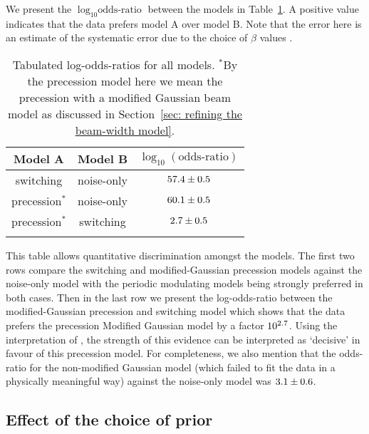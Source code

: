 \documentclass[../full_thesis/full_thesis.tex]{subfiles}
\begin{document}
We present the $\log_{10}\textrm{odds-ratio}$ between the models in
Table~\ref{tab: log odds-ratio}. A positive value indicates
that the data prefers model A over model B.
Note that the error here is an estimate of the systematic error due to the
choice of $\beta$ values \citep[see][for details]{Foreman-Mackay2013}.
\begin{table}
\caption{Tabulated log-odds-ratios for all models. $^{*}$By the precession
model here we mean the precession with a modified Gaussian beam model as
discussed in Section~\ref{sec: refining the beam-width model}.}
\label{tab: log odds-ratio}
\begin{tabular}{ccc}\hhline{===}
Model A & Model B & $\log_{10}(\textrm{odds-ratio})$ \\ \hline
switching & noise-only &
$57.4 \pm 0.5$ \\
precession$^{*}$ & noise-only &
$60.1 \pm 0.5 $ \\
precession$^{*}$ & switching &
$2.7 \pm 0.5 $ \\
\hhline{===}
\end{tabular}
\end{table}

This table allows quantitative discrimination amongst the models. The first two
rows compare the switching and modified-Gaussian precession models against the
noise-only model with the periodic modulating models being strongly preferred
in both cases. Then in the last row we present the log-odds-ratio between the
modified-Gaussian precession and switching model which shows that the data
prefers the precession Modified Gaussian model by a factor
$10^{2.7}$. Using the interpretation
of \citet{jeffreys1998theory}, the strength of this evidence can be interpreted
as `decisive' in favour of this precession model. For completeness, we also
mention that the odds-ratio for the non-modified Gaussian model (which failed
to fit the data in a physically meaningful way) against the noise-only model
was $3.1 \pm
0.6$.

\subsection{Effect of the choice of prior}
\label{sec: effect of the choice of prior}
\end{document}

